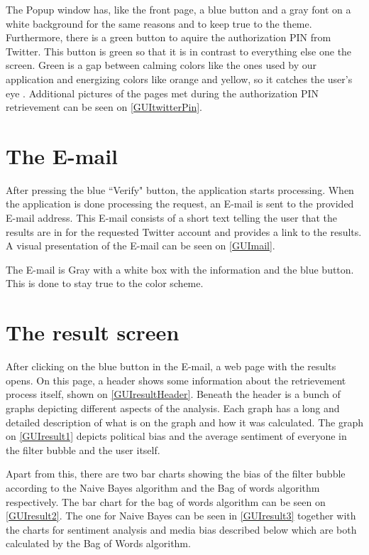 
The Popup window has, like the front page, a blue button and a gray font on a
white background for the same reasons and to keep true to the theme.
Furthermore, there is a green button to aquire the authorization PIN from
Twitter. This button is green so that it is in contrast to everything else one
the screen. Green is a gap between calming colors like the ones used by our
application and energizing colors like orange and yellow, so it catches the
user's eye \citep[p. 60]{WebUI}. Additional pictures of the pages met during the
authorization PIN retrievement can be seen on \autoref{GUItwitterPin}.

\section{The E-mail}
After pressing the blue ``Verify" button, the application starts processing.
When the application is done processing the request, an E-mail is sent to the provided E-mail address. This E-mail consists of a short text telling the user
that the results are in for the requested Twitter account and provides a link to
the results.
A visual presentation of the E-mail can be seen on \autoref{GUImail}.


The E-mail is Gray with a white box with the information and the blue button.
This is done to stay true to the color scheme. 

\section{The result screen}
After clicking on the blue button in the E-mail, a web page with the results
opens. On this page, a header shows some information about the retrievement
process itself, shown on \autoref{GUIresultHeader}. Beneath
the header is a bunch of graphs depicting different aspects of the analysis.
Each graph has a long and detailed description of what is on the graph and how
it was calculated. The graph on \autoref{GUIresult1} depicts political bias and
the average sentiment of everyone in the filter bubble and the user itself. 


Apart from this, there are two bar charts showing the bias of the
filter bubble according to the Naive Bayes algorithm and the Bag of words
algorithm respectively. The bar chart for the bag of words algorithm can be seen
on \autoref{GUIresult2}. The one for Naive Bayes can be seen in
\autoref{GUIresult3} together with the charts for
sentiment analysis and media bias described below which are both calculated by the Bag of Words algorithm.

